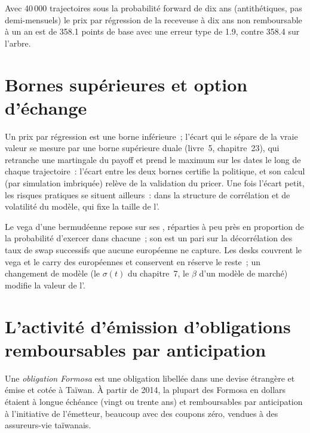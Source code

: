 \begin{example}\label{ex:rc:bermudans-and-callables:lsm}
Avec 40\,000 trajectoires sous la probabilité forward de dix ans (antithétiques, pas demi-mensuels)
le prix par régression de la receveuse à dix ans non remboursable à un an est de 358.1 points de base avec une
erreur type de 1.9, contre 358.4 sur l'arbre.
\end{example}

\section{Bornes supérieures et option d'échange}

Un prix par régression est une borne inférieure~; l'écart qui le sépare de la vraie valeur
se mesure par une borne supérieure duale (livre~5, chapitre~23), qui retranche une
martingale du payoff et prend le maximum sur les dates le long de chaque trajectoire~:
l'écart entre les deux bornes certifie la politique, et son calcul (par simulation imbriquée)
relève de la validation du pricer. Une fois l'écart petit, les
risques pratiques se situent ailleurs~: dans la structure de corrélation et de volatilité
du modèle, qui fixe la taille de l'.

\begin{remark}\label{rem:rc:bermudans-and-callables:hedge}
Le vega d'une bermudéenne repose sur ses , réparties à peu près
en proportion de la probabilité d'exercer dans chacune~; son  est un pari sur la
décorrélation des taux de swap successifs que aucune européenne ne capture. Les desks couvrent le
vega et le carry des européennes et conservent en réserve le reste~; un changement de modèle (le $\sigma(t)$
du chapitre~7, le $\beta$ d'un modèle de marché) modifie la valeur de l'.
\end{remark}

\section{L'activité d'émission d'obligations remboursables par anticipation}

\begin{definition}\label{def:rc:bermudans-and-callables:formosa}
Une \emph{obligation Formosa} est une obligation libellée dans une devise
étrangère et émise et cotée à Taïwan. À partir de 2014, la plupart des Formosa en dollars étaient
à longue échéance (vingt ou trente ans) et remboursables par anticipation à l'initiative de l'émetteur, beaucoup avec des
coupons zéro, vendues à des assureurs-vie taïwanais.
\end{definition}

